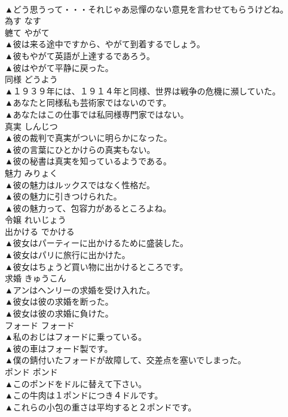 \documentclass[8pt]{extreport}
\begin{document}
\begin{CJK}{UTF8}{min}
\\	▲どう思うって・・・それじゃあ忌憚のない意見を言わせてもらうけどね。 
\\	為す	なす	
\\	軈て	やがて	
\\	▲彼は来る途中ですから、やがて到着するでしょう。 
\\	▲彼もやがて英語が上達するであろう。 
\\	▲彼はやがて平静に戻った。 
\\	同様	どうよう	
\\	▲１９３９年には、１９１４年と同様、世界は戦争の危機に瀕していた。 
\\	▲あなたと同様私も芸術家ではないのです。 
\\	▲あなたはこの仕事では私同様専門家ではない。 
\\	真実	しんじつ	
\\	▲彼の裁判で真実がついに明らかになった。 
\\	▲彼の言葉にひとかけらの真実もない。 
\\	▲彼の秘書は真実を知っているようである。 
\\	魅力	みりょく	
\\	▲彼の魅力はルックスではなく性格だ。 
\\	▲彼の魅力に引きつけられた。 
\\	▲彼の魅力って、包容力があるところよね。 
\\	令嬢	れいじょう	
\\	出かける	でかける	
\\	▲彼女はパーティーに出かけるために盛装した。 
\\	▲彼女はパリに旅行に出かけた。 
\\	▲彼女はちょうど買い物に出かけるところです。 
\\	求婚	きゅうこん	
\\	▲アンはヘンリーの求婚を受け入れた。 
\\	▲彼女は彼の求婚を断った。 
\\	▲彼女は彼の求婚に負けた。 
\\	フォード	フォード	
\\	▲私のおじはフォードに乗っている。 
\\	▲彼の車はフォード製です。 
\\	▲僕の錆付いたフォードが故障して、交差点を塞いでしまった。 
\\	ポンド	ポンド	
\\	▲このポンドをドルに替えて下さい。 
\\	▲この牛肉は１ポンドにつき４ドルです。 
\\	▲これらの小包の重さは平均すると２ポンドです。 

\end{CJK}
\end{document}
